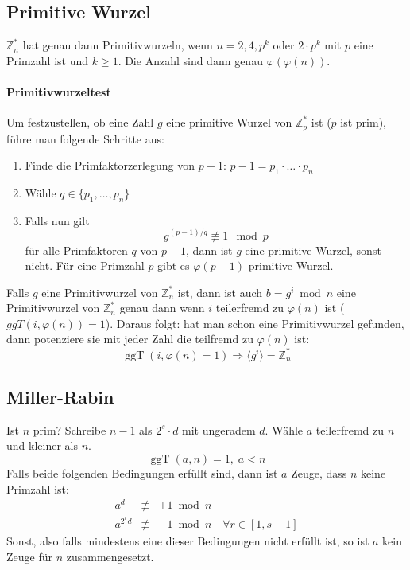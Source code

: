 \documentclass[8pt,a4paper,landscape]{article}
\begin{document}
\begin{multicols}{4}
\subsection{Primitive Wurzel}
\(\mathbb{Z}_{n}^{*}\) hat genau dann Primitivwurzeln,  wenn 
\(n = 2,4, p^{k}\) oder \(2 \cdot p^{k}\) mit \(p\) eine Primzahl ist und \(k \geq 1\). Die Anzahl sind dann genau \(\varphi(\varphi(n))\).

\paragraph{Primitivwurzeltest} Um festzustellen, ob eine Zahl $g$ eine primitive Wurzel von 
$\mathbb{Z}_{p}^{*}$ ist ($p$ ist prim), führe man folgende Schritte aus:
\begin{enumerate}
\item Finde die Primfaktorzerlegung von $p-1$: \( p-1=p_{1} \cdot \ldots \cdot  p_{n}\)
\item Wähle \(q \in \{p_{1}, \ldots,p_{n}\}\)
\item Falls nun gilt
\[
    \boxed{ g^{(p-1)/q} \not\equiv 1 \mod p }
\]
für alle Primfaktoren $q$ von $p-1$, dann ist $g$ eine primitive Wurzel,
sonst nicht. Für eine Primzahl $p$ gibt es $\varphi(p-1)$ primitive Wurzel.
\end{enumerate}
Falls $g$ eine Primitivwurzel von $\mathbb{Z}_{n}^{*}$ ist, dann ist auch 
$b = g^{i} \bmod n$ eine Primitivwurzel von $\mathbb{Z}_{n}^{*}$ genau dann 
wenn $i$ teilerfremd zu $\varphi(n)$ ist ($ggT(i, \varphi(n)) = 1$). Daraus folgt:
hat man schon eine Primitivwurzel gefunden, dann potenziere sie mit jeder Zahl die teilfremd zu $\varphi(n)$ ist:
\[
    \operatorname{ggT}(i, \varphi(n) = 1) \Rightarrow
    \langle g^{i} \rangle = \mathbb{Z}_{n}^{*}
\]

\subsection{Miller-Rabin}
Ist $n$ prim? Schreibe $n-1$ als $2^{s}\cdot d$ mit ungeradem $d$.
Wähle $a$ teilerfremd zu $n$ und kleiner als $n$. 
\[\operatorname{ggT}(a, n) = 1, \; a<n\]
Falls beide folgenden Bedingungen erfüllt sind, dann ist $a$ Zeuge,
dass $n$ keine Primzahl ist:
\begin{eqnarray}
a^{d} &\not\equiv& \pm 1 \bmod n \nonumber\\
a^{2^{r}d} &\not\equiv& -1 \bmod n \quad \forall r \in [1,s-1]\nonumber
\end{eqnarray}
Sonst, also falls mindestens eine dieser Bedingungen nicht erfüllt ist, so ist $a$ kein Zeuge für $n$ zusammengesetzt. 


\end{multicols}
\end{document}
